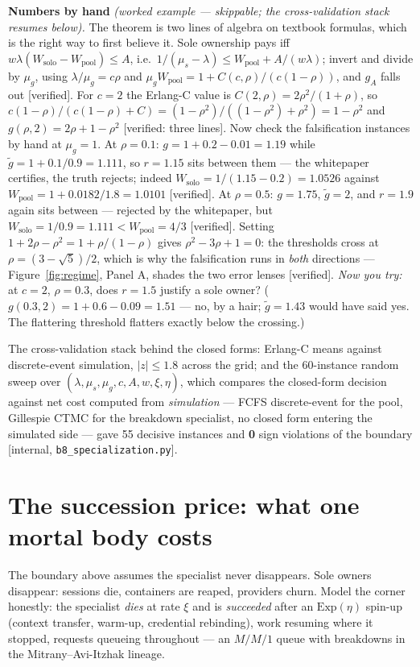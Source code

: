\documentclass[11pt,a4paper]{article}
\begin{document}
\begin{worked}
\noindent\textbf{Numbers by hand} \emph{(worked example --- skippable; the cross-validation stack resumes below).} The theorem
is two lines of algebra on textbook formulas, which is the right way to first believe
it. Sole ownership pays iff $w\lambda(W_{\mathrm{solo}}-W_{\mathrm{pool}}) \le A$, i.e.\ $1/(\mu_s-\lambda) \le W_{\mathrm{pool}}
+ A/(w\lambda)$; invert and divide by $\mu_g$, using $\lambda/\mu_g = c\rho$ and $\mu_g W_{\mathrm{pool}} = 1 +
C(c,\rho)/(c(1-\rho))$, and $g_A$ falls out [verified]. For $c=2$ the Erlang-C value is $C(2,\rho)=2\rho^2/(1+\rho)$, so
$c(1-\rho)/(c(1-\rho)+C) = (1-\rho^2)/((1-\rho^2)+\rho^2) = 1-\rho^2$ and $g(\rho,2) = 2\rho + 1 - \rho^2$ [verified: three
lines]. Now check the falsification instances by hand at $\mu_g=1$. At $\rho=0.1$: $g=1+0.2-0.01=1.19$ while
$\tilde g=1+0.1/0.9=1.111$, so $r=1.15$ sits between them --- the whitepaper certifies, the truth rejects; indeed
$W_{\mathrm{solo}}=1/(1.15-0.2)=1.0526$ against $W_{\mathrm{pool}}=1+0.0182/1.8=1.0101$ [verified]. At $\rho=0.5$:
$g=1.75$, $\tilde g=2$, and $r=1.9$ again sits between --- rejected by the whitepaper, but
$W_{\mathrm{solo}}=1/0.9=1.111 < W_{\mathrm{pool}}=4/3$ [verified]. Setting $1+2\rho-\rho^2 = 1+\rho/(1-\rho)$ gives
$\rho^2-3\rho+1=0$: the thresholds cross at $\rho=(3-\sqrt5)/2$, which is why the falsification runs in \emph{both} directions
--- Figure~\ref{fig:regime}, Panel A, shades the two error lenses [verified]. \emph{Now you try:} at $c{=}2$, $\rho{=}0.3$, does $r=1.5$ justify a sole owner? ($g(0.3,2)=1+0.6-0.09=1.51$ --- no,
by a hair; $\tilde g=1.43$ would have said yes. The flattering threshold flatters exactly below the crossing.)
\end{worked}

The cross-validation stack behind the closed forms: Erlang-C means against discrete-event simulation, $|z|\le1.8$ across the
grid; and the 60-instance random sweep over $(\lambda,\mu_s,\mu_g,c,A,w,\xi,\eta)$, which compares the closed-form decision
against net cost computed from \emph{simulation} --- FCFS discrete-event for the pool, Gillespie CTMC for the breakdown
specialist, no closed form entering the simulated side --- gave 55 decisive instances and \textbf{0} sign violations of the
boundary [internal, \texttt{b8\_specialization.py}].



\section{The succession price: what one mortal body costs}\label{sec:succession}
The boundary above assumes the specialist never disappears. Sole owners disappear: sessions die, containers are reaped,
providers churn. Model the corner honestly: the specialist \emph{dies} at rate $\xi$ and is \emph{succeeded} after an
$\mathrm{Exp}(\eta)$ spin-up (context transfer, warm-up, credential rebinding), work resuming where it stopped, requests
queueing throughout --- an $M/M/1$ queue with breakdowns in the Mitrany--Avi-Itzhak lineage.
\end{document}
